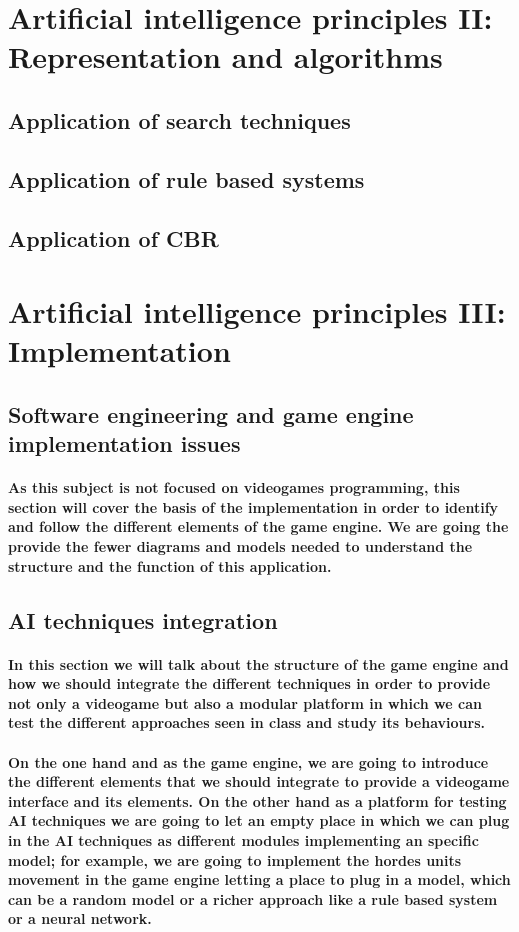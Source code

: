 \documentclass[a4paper,10pt]{article}
\newcommand{\p}[1]{\paragraph{\indent\textnormal{#1}}}
\begin{document}
  \newpage
\section{Artificial intelligence principles II: Representation and algorithms}

  \subsection{Application of search techniques}

  \subsection{Application of rule based systems}

  \subsection{Application of CBR}

\newpage
\section{Artificial intelligence principles III: Implementation}

  \subsection{Software engineering and game engine implementation issues}

    \p{As this subject is not focused on videogames programming, this section will cover the basis of the implementation in order to identify and follow the different elements of the game engine. We are going the provide the fewer diagrams and models needed to understand the structure and the function of this application.}




  \subsection{AI techniques integration}

  \p{In this section we will talk about the structure of the game engine and how we should integrate the different techniques in order to provide not only a videogame but also a modular platform in which we can test the different approaches seen in class and study its behaviours.}

  \p{On the one hand and as the game engine, we are going to introduce the different elements that we should integrate to provide a videogame interface and its elements. On the other hand as a platform for testing AI techniques we are going to let an empty place in which we can plug in the AI techniques as different modules implementing an specific model; for example, we are going to implement the hordes units movement in the game engine letting a place to plug in a model, which can be a random model or a richer approach like a rule based system or a neural network.}
  
\end{document}
